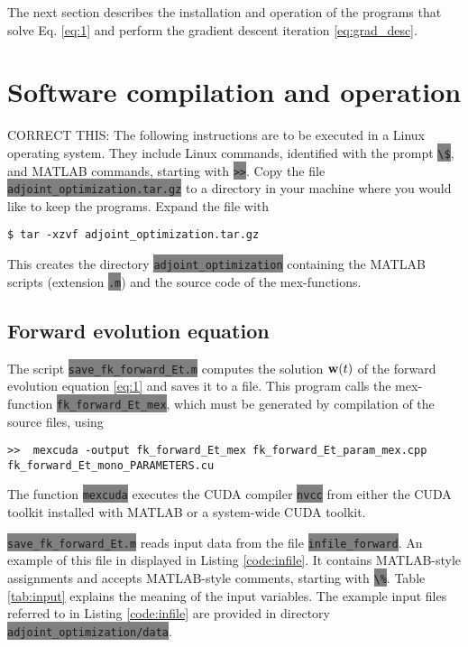 \documentclass{article}
\newcommand{\code}[1]{\colorbox{gray}{\lstinline|#1|}}
\begin{document}
The next section describes the installation and operation of the programs that solve Eq. \eqref{eq:1} and perform the gradient descent iteration \eqref{eq:grad_desc}.
  

\section{Software compilation and operation}
{\color{red}CORRECT THIS: The following instructions are to be executed in a Linux operating system. They include Linux commands, identified with the prompt \code{\$}, and MATLAB commands, starting with \code{>>}.
Copy the file \code{adjoint_optimization.tar.gz} to a directory in your machine where you would like to keep the programs. Expand the file with
\begin{lstlisting}
$ tar -xzvf adjoint_optimization.tar.gz
\end{lstlisting}
This creates the directory \code{adjoint_optimization} containing the MATLAB scripts (extension \code{.m}) and the source code of the mex-functions.}

\subsection{Forward evolution equation}
The script \code{save_fk_forward_Et.m} computes the solution ${\bf w}(t)$ of the forward evolution equation \eqref{eq:1} and saves it to a file. This program calls the mex-function \code{fk_forward_Et_mex},
which must be generated by compilation of the source files, using
\begin{lstlisting}
>>  mexcuda -output fk_forward_Et_mex fk_forward_Et_param_mex.cpp fk_forward_Et_mono_PARAMETERS.cu
\end{lstlisting}
The function \code{mexcuda} executes  the CUDA compiler \code{nvcc} from either the CUDA toolkit installed with MATLAB or a system-wide CUDA toolkit.

\code{save_fk_forward_Et.m} reads input data from the file \code{infile_forward}. An example of this file in displayed in Listing \ref{code:infile}. It contains MATLAB-style assignments and accepts MATLAB-style comments, starting with \code{\%}. Table \ref{tab:input} explains the meaning of the input variables. The example input files referred to in Listing \ref{code:infile} are provided in directory \code{adjoint_optimization/data}.
\end{document}

